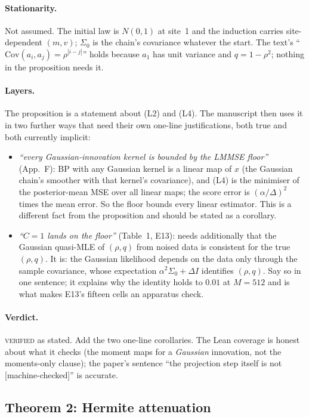 \documentclass[11pt,a4paper]{article}
\newcommand{\sev}[1]{\textsc{#1}}
\theoremstyle{definition}
\theoremstyle{remark}
\begin{document}
\paragraph{Stationarity.} Not assumed. The initial law is $N(0,1)$ at site~1 and the induction carries site-dependent $(m,v)$; $\Sigma_0$ is the chain's covariance whatever the start. The text's ``$\mathrm{Cov}(a_i,a_j)=\rho^{|i-j|}$'' holds because $a_1$ has unit variance and $q=1-\rho^2$; nothing in the proposition needs it.

\paragraph{Layers.} The proposition is a statement about (L2) and (L4). The manuscript then uses it in two further ways that need their own one-line justifications, both true and both currently implicit:
\begin{itemize}
\item \emph{``every Gaussian-innovation kernel is bounded by the LMMSE floor''} (App.~F): BP with any Gaussian kernel is a linear map of $x$ (the Gaussian chain's smoother with that kernel's covariance), and (L4) is the minimiser of the posterior-mean MSE over all linear maps; the score error is $(\alpha/\Delta)^2$ times the mean error. So the floor bounds every linear estimator. This is a different fact from the proposition and should be stated as a corollary.
\item \emph{``$C=1$ lands on the floor''} (Table~1, E13): needs additionally that the Gaussian quasi-MLE of $(\rho,q)$ from noised data is consistent for the true $(\rho,q)$. It is: the Gaussian likelihood depends on the data only through the sample covariance, whose expectation $\alpha^2\Sigma_0+\Delta I$ identifies $(\rho,q)$. Say so in one sentence; it explains why the identity holds to $0.01$ at $M=512$ and is what makes E13's fifteen cells an apparatus check.
\end{itemize}

\paragraph{Verdict.} \sev{verified} as stated. Add the two one-line corollaries. The Lean coverage is honest about what it checks (the moment maps for a \emph{Gaussian} innovation, not the moments-only clause); the paper's sentence ``the projection step itself is not [machine-checked]'' is accurate.

\subsection{Theorem 2: Hermite attenuation}
\end{document}
